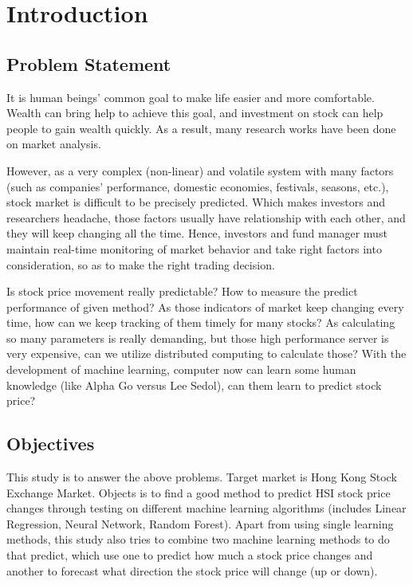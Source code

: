 \chapter{Introduction} 

\section{Problem Statement}

It is human beings' common goal to make life easier and more comfortable. Wealth can bring help to achieve this goal, and investment on stock can help people to gain wealth quickly. As a result, many research works have been done on market analysis.\par 

However, as a very complex (non-linear) and volatile system with many factors (such as companies' performance, domestic economies, festivals, seasons, etc.)\cite{chen1986economic}, stock market is difficult to be precisely predicted. Which makes investors and researchers headache, those factors usually have relationship with each other, and they will keep changing all the time. Hence, investors and fund manager must maintain real-time monitoring of market behavior and take right factors into consideration, so as to make the right trading decision.\par

Is stock price movement really predictable? How to measure the predict performance of given method? As those indicators of market keep changing every time, how can we keep tracking of them timely for many stocks? As calculating so many parameters is really demanding, but those high performance server is very expensive, can we utilize distributed computing to calculate those? With the development of machine learning, computer now can learn some human knowledge (like Alpha Go versus Lee Sedol), can them learn to predict stock price?

\section{Objectives}

This study is to answer the above problems. Target market is Hong Kong Stock Exchange Market. Objects is to find a good method to predict HSI stock price changes through testing on different machine learning algorithms (includes Linear Regression, Neural Network, Random Forest). Apart from using single learning methods, this study also tries to combine two machine learning methods to do that predict, which use one to predict how much a stock price changes and another to forecast what direction the stock price will change (up or down). 

